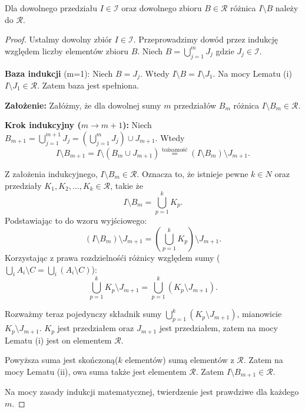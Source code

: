 \begin{lemma}
	Dla dowolnego przedziału $I\in \mathcal{I}$ oraz dowolnego zbioru $B\in \mathcal{R}$ różnica $I\setminus B$ należy do $\mathcal{R}$.
\end{lemma} 
\begin{proof}
	Ustalmy dowolny zbiór $I\in \mathcal{I}$. Przeprowadzimy dowód przez indukcję względem liczby elementów zbioru $B$. Niech $B = \bigcup_{j=1} ^{m}J_{j}$ gdzie $J_{j}\in \mathcal{I}$.

\textbf{Baza indukcji} (m=1): Niech $B= J_{j}$. Wtedy $I\setminus B = I\setminus J_1$. Na mocy Lematu (i) $I\setminus J_1 \in \mathcal{R}$. Zatem baza jest spełniona.

\textbf{Założenie:} Załóżmy, że dla dowolnej sumy $m$ przedziałów $B_{m}$ różnica $I\setminus B_{m}\in \mathcal{R}$.

\textbf{Krok indukcyjny ($m\to m+1$):} Niech $B_{m+1}= \bigcup_{j=1} ^{m+1}J_{j} = \left( \bigcup_{j=1} ^{m} J_{j}\right) \cup J_{m+1} $. Wtedy
\[
I\setminus B_{m+1} = I\setminus \left( B_{m}\cup J_{m+1} \right) \overset{\text{tożsamość}}{=} \left( I\setminus B_{m} \right) \setminus J_{m+1}
.\] 
    
Z założenia indukcyjnego, $I\setminus B_{m}\in \mathcal{R}$. Oznacza to, że istnieje pewne $k\in N$ oraz przedziały  $K_1,K_2,\ldots,K_{k}\in \mathcal{R}$, takie że
\[
I\setminus B_{m} = \bigcup_{p=1}^{k}K_{p}
.\] 
Podstawiając to do wzoru wyjściowego:
\[
	\left( I\setminus B_{m} \right) \setminus J_{m+1} = \left( \bigcup_{p=1} ^{k}K_{p} \right) \setminus J_{m+1}
.\] 
Korzystając z prawa rozdzielnośći różnicy względem sumy ($\bigcup_{i}  A_{i} \setminus C = \bigcup_{i}  \left( A_{i} \setminus C\right)$):
\[
\bigcup_{p=1} ^{k}K_{p}\setminus J_{m+1} = \bigcup_{p=1} ^{k}\left( K_{p}\setminus J_{m+1} \right) 
.\] 

Rozważmy teraz pojedynczy składnik sumy $\bigcup_{p=1} ^{k}\left( K_{p}\setminus J_{m+1} \right) $, mianowicie $K_{p}\setminus J_{m+1}$. $K_{p}$ jest przedziałem oraz $J_{m+1}$ jest przedziałem, zatem na mocy Lematu (i) jest on elementem $\mathcal{R}$. 

Powyższa suma jest skończoną($k$ elementów) sumą elementów z $\mathcal{R}$. Zatem na mocy Lematu (ii), owa suma także jest elementem $\mathcal{R}$. Zatem $I\setminus B_{m+1} \in \mathcal{R}$.

Na mocy zasady indukcji matematycznej, twierdzenie jest prawdziwe dla każdego $m$.
\end{proof} 

